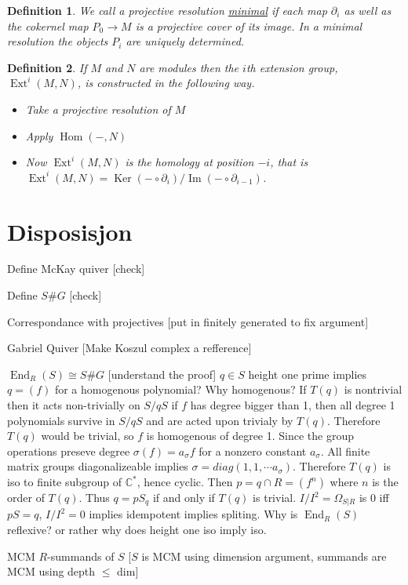 \documentclass[11pt, a4paper, english]{article}
\numberwithin{prop}{section}
\numberwithin{lemma}{section}
\numberwithin{theorem}{section}
\newtheorem{defin}{Definition}
\numberwithin{defin}{section}
\numberwithin{example}{section}
\newcommand{\C}{\mathbb{C}}
\DeclareMathOperator{\Hom}{Hom}
\DeclareMathOperator{\Ext}{Ext}
\DeclareMathOperator{\End}{End}
\DeclareMathOperator{\Image}{Im}
\DeclareMathOperator{\Ker}{Ker}
\begin{document}
\begin{appendices}
\begin{defin}
We call a projective resolution \underline{minimal} if each map $\partial_i$ as well as the cokernel map $P_0 \to M$ is a projective cover of its image. In a minimal resolution the objects $P_i$ are uniquely determined.
\end{defin}

\begin{defin}
\label{def:Ext}
If $M$ and $N$ are modules then the $i$th extension group, $\Ext^i(M, N)$, is constructed in the following way.
\begin{itemize}
\item Take a projective resolution of $M$
\begin{center}
\end{center}
\item Apply $\Hom(-,N)$
\begin{center}
\end{center}
\item Now $\Ext^i(M, N)$ is the homology at position $-i$, that is $\Ext^i(M,N) = \Ker (- \circ \partial_{i}) / \Image (- \circ \partial_{i-1})$.
\end{itemize}
\end{defin}
\end{appendices}

\section{Disposisjon}
Define McKay quiver [check]

Define $S\#G$ [check]

Correspondance with projectives [put in finitely generated to fix argument]

Gabriel Quiver [Make Koszul complex a refference]

$\End_R(S) \cong S\#G$ [understand the proof]
$q \in S$ height one prime implies $q = (f)$ for a homogenous polynomial? Why homogenous?
If $T(q)$ is nontrivial then it acts non-trivially on $S/qS$ if $f$ has degree bigger than 1, then all degree 1 polynomials survive in $S/qS$ and are acted upon trivialy by $T(q)$. Therefore $T(q)$ would be trivial, so $f$ is homogenous of degree 1.
Since the group operations preseve degree $\sigma(f) = a_\sigma f$ for a nonzero constant $a_\sigma$. All finite matrix groups diagonalizeable implies $\sigma = diag(1,1, \cdots a_\sigma)$. Therefore $T(q)$ is iso to finite subgroup of $\C^*$, hence cyclic.
Then $p=q \cap R = (f^n)$ where $n$ is the order of $T(q)$. Thus $q = pS_q$ if and only if $T(q)$ is trivial.
$I/I^2 = \Omega_{S|R}$ is 0 iff $pS = q$, $I/I^2 = 0$ implies idempotent implies spliting.
Why is $\End_R(S)$ reflexive? or rather why does height one iso imply iso.

MCM $R$-summands of $S$ 
[$S$ is MCM using dimension argument, summands are MCM using depth $\leq$ dim]

\nocite{*}


\end{document}
